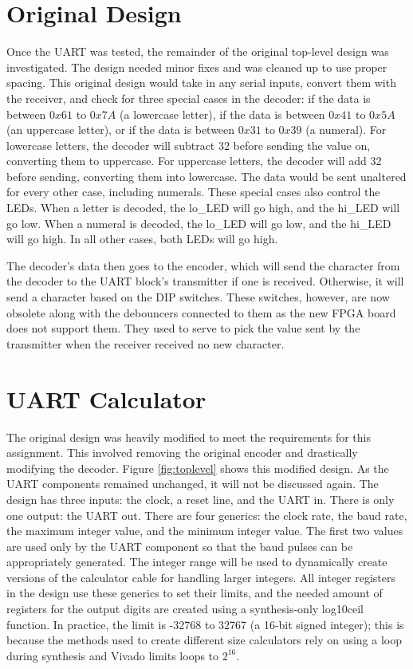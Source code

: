 \documentclass[11pt]{article}
\begin{document}
\section{Original Design}
Once the UART was tested, the remainder of the original top-level design was investigated.
The design needed minor fixes and was cleaned up to use proper spacing. 
This original design would take in any serial inputs, convert them with the receiver, and check for three special cases in the decoder:
if the data is between $0x61$ to $0x7A$ (a lowercase letter), 
if the data is between $0x41$ to $0x5A$ (an uppercase letter), 
or if the data is between $0x31$ to $0x39$ (a numeral).
For lowercase letters, the decoder will subtract 32 before sending the value on, converting them to uppercase.
For uppercase letters, the decoder will add 32 before sending, converting them into lowercase.
The data would be sent unaltered for every other case, including numerals.
These special cases also control the LEDs.
When a letter is decoded, the lo\_LED will go high, and the hi\_LED will go low.
When a numeral is decoded,  the lo\_LED will go low, and the hi\_LED will go high.
In all other cases, both LEDs will go high.

The decoder's data then goes to the encoder, which will send the character from the decoder to the UART block's transmitter if one is received.
Otherwise, it will send a character based on the DIP switches.
These switches, however, are now obsolete along with the debouncers connected to them as the new FPGA board does not support them.
They used to serve to pick the value sent by the transmitter when the receiver received no new character.


\section{UART Calculator}
The original design was heavily modified to meet the requirements for this assignment.
This involved removing the original encoder and drastically modifying the decoder.
Figure \ref{fig:toplevel} shows this modified design.
As the UART components remained unchanged, it will not be discussed again.
The design has three inputs: the clock, a reset line, and the UART in.
There is only one output: the UART out.
There are four generics: the clock rate, the baud rate, the maximum integer value, and the minimum integer value.
The first two values are used only by the UART component so that the baud pulses can be appropriately generated.
The integer range will be used to dynamically create versions of the calculator cable for handling larger integers.
All integer registers in the design use these generics to set their limits, and the needed amount of registers for the output digits are created using a synthesis-only log10ceil function.
In practice, the limit is -32768 to 32767 (a 16-bit signed integer); this is because the methods used to create different size calculators rely on using a loop during synthesis and Vivado limits loops to $2^{16}$.
\end{document}

